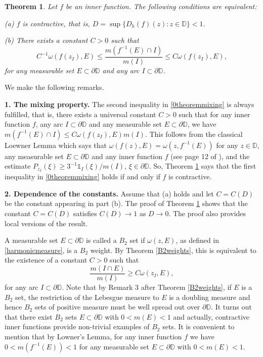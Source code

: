 \documentclass[a4paper,12pt]{article}
\newtheorem{theorem}{Theorem}[section]
\theoremstyle{definition}
\numberwithin{equation}{section}
\newcommand{\D}{\mathbb D}
\begin{document}
\begin{theorem}
\label{mixing}
Let $f$ be an inner function. The following conditions are equivalent:

(a) $f$ is contractive, that is,  $D = \sup \{D_h (f) (z) : z \in \D\} < 1$. 

(b) There exists a constant $C>0$ such that
\begin{equation}
    \label{0theoremmixing}
    C^{-1} \omega \left(f\left(z_{I}\right), E\right) \leqslant \frac{m\left(f^{-1}(E) \cap I\right)}{m(I)} \leqslant C \omega \left(f\left(z_{I}\right), E\right), 
\end{equation}
for any measurable set $E \subset \partial \mathbb{D}$ and any arc $I \subset \partial \mathbb{D}$. 
    
\end{theorem}

We make the following remarks. 

\textbf{1. The mixing property.} The second inequality in \eqref{0theoremmixing} is always fulfilled, that is, there exists a universal constant $C>0$ such that for any inner function $f$, any arc $I \subset \partial \D$ and any measurable set $E \subset \partial \D$, we have $
m (f^{-1}  (E)  \cap I ) \leq C \omega (f (z_{I}), E) m (I)$. This follows from the classical Loewner Lemma which says that $\omega (f(z), E) = \omega (z, f^{-1} (E))$ for any $z \in \D$, any measurable set $E \subset \partial \D$ and any inner function $f$ (see page 12 of \cite{Ahl}), and the estimate $P_{z_I} (\xi) \geq 3^{-1} {\mathbb{1}}_{I} (\xi) / m(I)$, $\xi \in \partial \D$. So, Theorem \ref{mixing} says that the first inequality in \eqref{0theoremmixing} holds if and only if $f$ is contractive. 

\textbf{2. Dependence of the constants.} Assume that (a) holds and let $C=C(D)$ be the constant appearing in part (b). The proof of Theorem \ref{mixing} shows that the constant $C=C(D)$ satisfies $ C(D) \longrightarrow 1$ as $D \rightarrow 0 $. The proof also provides local versions of the result. 

\vspace{0.2cm}

A measurable set $E \subset \partial \D$ is called a $B_2$ set if $\omega(z, E)$, as defined in \eqref{harmonicmeasure}, is a $B_2$ weight. By Theorem \ref{B2weights}, this is equivalent to the existence of a constant $C>0$ such that 
$$
\frac{m(I \cap E)}{m(I)} \geq C \omega (z_I, E),
$$
for any arc $I \subset \partial \D$. Note that by Remark 3 after Theorem \ref{B2weights}, if $E$ is a $B_2$ set,  the restriction of the Lebesgue measure to $E$ is a doubling measure and hence $B_2$ sets of positive measure must be well spread out over $\partial \D$. It turns out that there exist $B_2$ sets $E\subset \partial \D$ with $0<m(E) < 1$ and actually, contractive inner functions provide non-trivial examples of $B_2$ sets. It is convenient to mention that by Lowner's Lemma,  for any inner function $f$ we have $0< m(f^{-1} (E)) < 1$ for any measurable set $E \subset \partial \D$ with $0< m(E) < 1$. 
\end{document}
